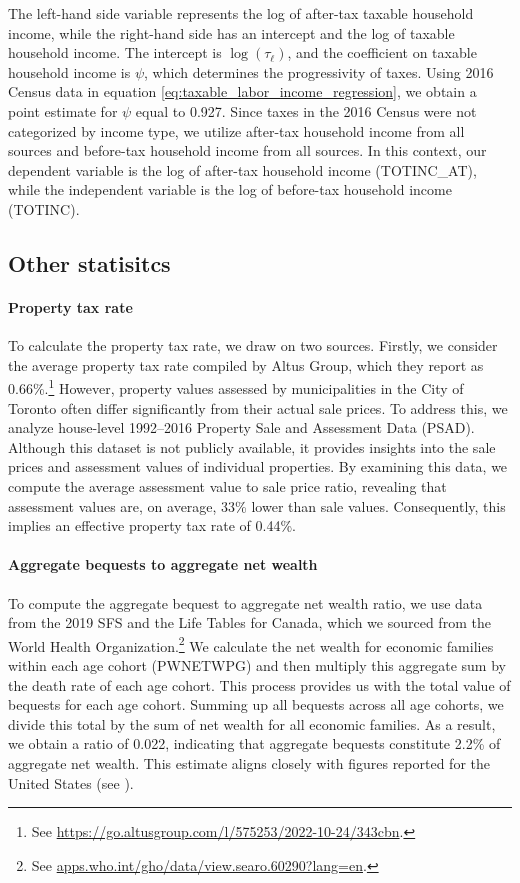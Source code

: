 \documentclass[parskip=full]{article}
\begin{document}
\noindent The left-hand side variable represents the log of after-tax taxable household income, while the right-hand side has an intercept and the log of taxable household income. The intercept is $\log(\tau_{\ell})$, and the coefficient on taxable household income is $\psi$, which determines the progressivity of taxes. Using 2016 Census data in equation \eqref{eq:taxable_labor_income_regression}, we obtain a point estimate for $\psi$ equal to 0.927. Since taxes in the 2016 Census were not categorized by income type, we utilize after-tax household income from all sources and before-tax household income from all sources. In this context, our dependent variable is the log of after-tax household income (TOTINC\_AT), while the independent variable is the log of before-tax household income (TOTINC).

\subsection{Other statisitcs}

\paragraph{Property tax rate}

To calculate the property tax rate, we draw on two sources. Firstly, we consider the average property tax rate compiled by Altus Group, which they report as 0.66\%.\footnote{See \url{https://go.altusgroup.com/l/575253/2022-10-24/343cbn}.} However, property values assessed by municipalities in the City of Toronto often differ significantly from their actual sale prices. To address this, we analyze house-level 1992--2016 Property Sale and Assessment Data (PSAD). Although this dataset is not publicly available, it provides insights into the sale prices and assessment values of individual properties. By examining this data, we compute the average assessment value to sale price ratio, revealing that assessment values are, on average, 33\% lower than sale values. Consequently, this implies an effective property tax rate of 0.44\%.

\paragraph{Aggregate bequests to aggregate net wealth}

To compute the aggregate bequest to aggregate net wealth ratio, we use data from the 2019 SFS and the Life Tables for Canada, which we sourced from the World Health Organization.\footnote{See \url{apps.who.int/gho/data/view.searo.60290?lang=en}.} We calculate the net wealth for economic families within each age cohort (PWNETWPG) and then multiply this aggregate sum by the death rate of each age cohort. This process provides us with the total value of bequests for each age cohort. Summing up all bequests across all age cohorts, we divide this total by the sum of net wealth for all economic families. As a result, we obtain a ratio of 0.022, indicating that aggregate bequests constitute 2.2\% of aggregate net wealth. This estimate aligns closely with figures reported for the United States (see \citet{cagetti-denardi-2006}).
\end{document}
